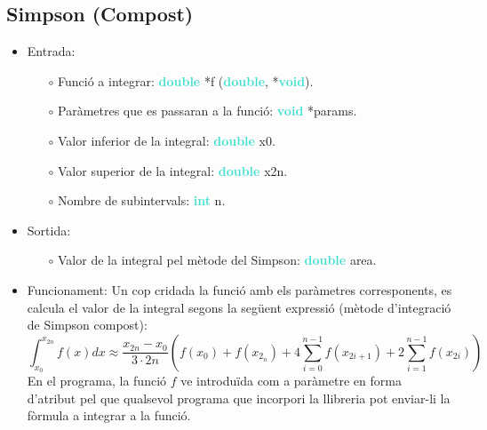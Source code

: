 \documentclass[12pt]{article}
\begin{document}
\subsection{Simpson (Compost)}
\begin{itemize}
    \item Entrada:
    \begin{itemize}
        \item[$\circ$] Funció a integrar: \textbf{\textcolor{Turquoise}{double}} *f (\textbf{\textcolor{Turquoise}{double}},  *\textbf{\textcolor{Turquoise}{void}}).
        \item[$\circ$] Paràmetres que es passaran a la funció: \textbf{\textcolor{Turquoise}{void}} *params.
        \item[$\circ$] Valor inferior de la integral: \textbf{\textcolor{Turquoise}{double}} x0.
        \item[$\circ$] Valor superior de la integral: \textbf{\textcolor{Turquoise}{double}} x2n.
        \item[$\circ$] Nombre de subintervals: \textbf{\textcolor{Turquoise}{int}} n.
    \end{itemize}
    \item Sortida:
        \begin{itemize}
            \item[$\circ$] Valor de la integral pel mètode del Simpson: \textbf{\textcolor{Turquoise}{double}} area.
        \end{itemize}
    \item Funcionament:
    Un cop cridada la funció amb els paràmetres corresponents, es calcula el valor de la integral segons la següent expressió (mètode d'integració de Simpson compost):
       \begin{equation*}
            \int_{x_0}^{x_{2n}}f(x)dx \approx \frac{x_{2n}-x_0}{3\cdot 2n} \left(f(x_0) + f(x_2_n) + 4\sum_{i=0}^{n-1}f(x_{2i+1}) + 2\sum_{i=1}^{n-1}f(x_{2i})\right)
        \end{equation*}
        En el programa, la funció $f$ ve introduïda com a paràmetre en forma d'atribut pel que qualsevol programa que incorpori la llibreria pot enviar-li la fòrmula a integrar a la funció.

    
\end{itemize}
\newpage
\end{document}
